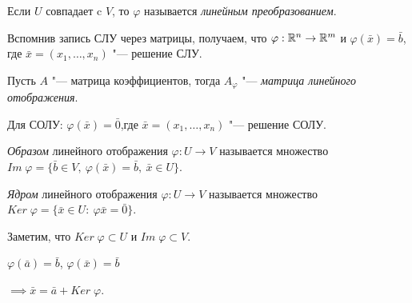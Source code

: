 Если $U$ совпадает c $V$, то $\varphi$ называется \textit{линейным преобразованием}.

Вспомнив запись СЛУ через матрицы, получаем, что 
$\varphi: \mathbb{R}^n \to \mathbb{R}^m$ и $\varphi(\bar{x}) = \bar{b}$, где $\bar{x} = (x_1, \ldots, x_n)$ "--- решение СЛУ.

Пусть  $A$ "--- матрица коэффициентов, тогда $A_\varphi$ "--- \textit{матрица линейного отображения}.

Для СОЛУ: $\varphi(\bar{x}) = \bar{0}$,где $\bar{x} = (x_1, \ldots, x_n)$ "--- решение СОЛУ.
\begin{definition}
    \textit{Образом} линейного отображения $\varphi: U \to V$ называется множество $Im\;\varphi = \{\bar{b} \in V, ~\varphi(\bar{x}) = \bar{b}, ~\bar{x} \in U \}$.
\end{definition}
\begin{definition}
    \label{def:core_lin}
    \textit{Ядром} линейного отображения $\varphi: U \to V$ называется множество $Ker\;\varphi = \{\bar{x} \in U:~\varphi{\bar{x}} = \bar{0} \}$.
\end{definition}
Заметим, что $Ker\;\varphi \subset U$ и $Im\;\varphi \subset V$.

\begin{theorem}
    $\varphi(\bar{a}) = \bar{b}$, $\varphi(\bar{x}) = \bar{b}$

    $\implies \bar{x} = \bar{a} + Ker\;\varphi$.
\end{theorem}


